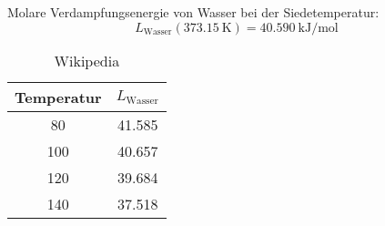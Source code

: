 Molare Verdampfungsenergie von Wasser bei der Siedetemperatur\cite[Kapitel~5.6.1: Koexistenz von Flüssigkeit und Dampf]{Gerthsen}:
\begin{equation*}
L_\text{Wasser}(\SI{373.15}{\kelvin}) = \SI{40.590}{\kilo\joule\per\mol}
\end{equation*}
\begin{table}[h!]
\begin{center}
\begin{tabular}{c | c}
	Temperatur & $L_\text{Wasser}$ \\
	\hline
	80 & 41.585 \\
	100 & 40.657 \\
	120 & 39.684 \\
	140 & 37.518
\end{tabular}
\end{center}
\caption{Wikipedia}
\end{table}